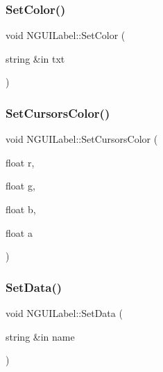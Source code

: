 \hypertarget{class_n_g_u_i_label_ae338445badab040ff52c96284737ab10}{}\label{class_n_g_u_i_label_ae338445badab040ff52c96284737ab10} 
\subsubsection{\texorpdfstring{Set\+Color()}{SetColor()}\hspace{0.1cm}{\footnotesize\ttfamily [2/2]}}
{\footnotesize\ttfamily void N\+G\+U\+I\+Label\+::\+Set\+Color (\begin{DoxyParamCaption}\item[{string \&in}]{txt }\end{DoxyParamCaption})}

\hypertarget{class_n_g_u_i_label_aeaedd5d99d2219905c4021692066010e}{}\label{class_n_g_u_i_label_aeaedd5d99d2219905c4021692066010e} 
\subsubsection{\texorpdfstring{Set\+Cursors\+Color()}{SetCursorsColor()}}
{\footnotesize\ttfamily void N\+G\+U\+I\+Label\+::\+Set\+Cursors\+Color (\begin{DoxyParamCaption}\item[{float}]{r,  }\item[{float}]{g,  }\item[{float}]{b,  }\item[{float}]{a }\end{DoxyParamCaption})}

\hypertarget{class_n_g_u_i_label_aeb9cc70bcb533a07b391afe536d75b10}{}\label{class_n_g_u_i_label_aeb9cc70bcb533a07b391afe536d75b10} 
\subsubsection{\texorpdfstring{Set\+Data()}{SetData()}}
{\footnotesize\ttfamily void N\+G\+U\+I\+Label\+::\+Set\+Data (\begin{DoxyParamCaption}\item[{string \&in}]{name }\end{DoxyParamCaption})}

